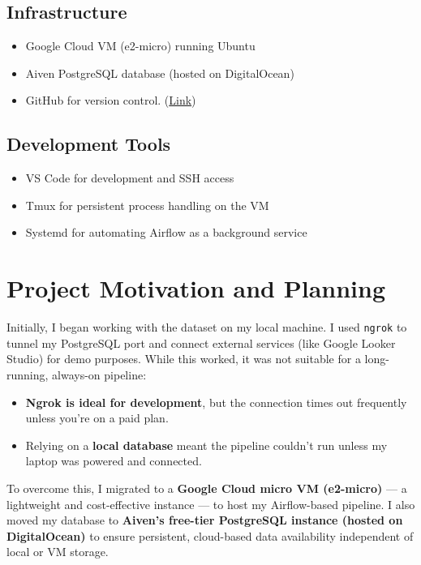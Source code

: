 \documentclass[12pt]{article}
\begin{document}
\subsection*{Infrastructure}
\begin{itemize}
\item Google Cloud VM (e2-micro) running Ubuntu
\item Aiven PostgreSQL database (hosted on DigitalOcean)
\item GitHub for version control. (\href{https://github.com/nishanKhanal/e2e-data-pipeline-for-chicago-crime}{Link})
\end{itemize}

\subsection*{Development Tools}
\begin{itemize}
\item VS Code for development and SSH access
\item Tmux for persistent process handling on the VM
\item Systemd for automating Airflow as a background service
\end{itemize}

\section{Project Motivation and Planning}

Initially, I began working with the dataset on my local machine. I used \texttt{ngrok} to tunnel my PostgreSQL port and connect external services (like Google Looker Studio) for demo purposes. While this worked, it was not suitable for a long-running, always-on pipeline:

\begin{itemize}
\item \textbf{Ngrok is ideal for development}, but the connection times out frequently unless you're on a paid plan.
\item Relying on a \textbf{local database} meant the pipeline couldn't run unless my laptop was powered and connected.
\end{itemize}

To overcome this, I migrated to a \textbf{Google Cloud micro VM (e2-micro)} — a lightweight and cost-effective instance — to host my Airflow-based pipeline. I also moved my database to \textbf{Aiven's free-tier PostgreSQL instance (hosted on DigitalOcean)} to ensure persistent, cloud-based data availability independent of local or VM storage.
\end{document}
